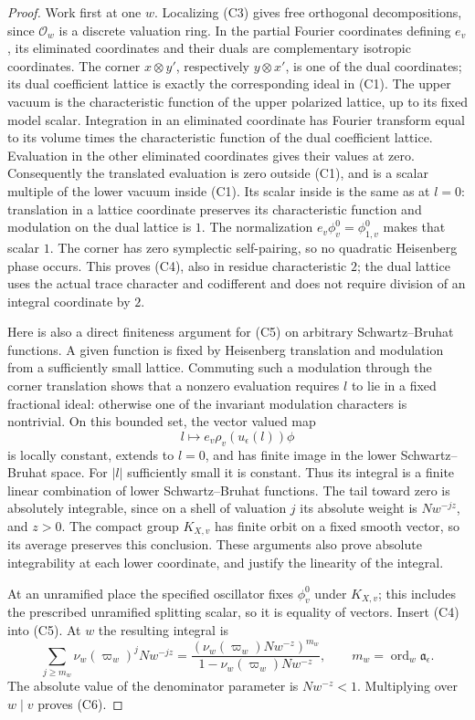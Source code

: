 \begin{proof}
Work first at one \(w\). Localizing (C3) gives free orthogonal
decompositions, since \(\mathcal O_w\) is a discrete valuation ring.
In the partial Fourier coordinates defining \(e_v\), its eliminated
coordinates and their duals are complementary isotropic coordinates.
The corner \(x\otimes y'\), respectively \(y\otimes x'\), is one
of the dual coordinates; its dual coefficient lattice is exactly the
corresponding ideal in (C1). The upper vacuum is the characteristic
function of the upper polarized lattice, up to its fixed model scalar.
Integration in an eliminated coordinate has Fourier transform equal to
its volume times the characteristic function of the dual coefficient
lattice. Evaluation in the other eliminated coordinates gives their
values at zero. Consequently the translated evaluation is zero outside
(C1), and is a scalar multiple of the lower vacuum inside (C1).
Its scalar inside is the same as at \(l=0\): translation in a lattice
coordinate preserves its characteristic function and modulation on the
dual lattice is \(1\). The normalization
\(e_v\phi_v^0=\phi_{1,v}^0\) makes that scalar \(1\).
The corner has zero symplectic self-pairing, so no quadratic Heisenberg
phase occurs. This proves (C4), also in residue characteristic \(2\);
the dual lattice uses the actual trace character and codifferent and
does not require division of an integral coordinate by \(2\).

Here is also a direct finiteness argument for (C5) on arbitrary
Schwartz--Bruhat functions. A given function is fixed by Heisenberg
translation and modulation from a sufficiently small lattice.
Commuting such a modulation through the corner translation shows that
a nonzero evaluation requires \(l\) to lie in a fixed fractional ideal:
otherwise one of the invariant modulation characters is nontrivial.
On this bounded set, the vector valued map
\[
 l\longmapsto e_v\rho_v(u_\epsilon(l))\phi
\]
is locally constant, extends to \(l=0\), and has finite image in the
lower Schwartz--Bruhat space. For \(|l|\) sufficiently small it is
constant. Thus its integral is a finite linear combination of lower
Schwartz--Bruhat functions. The tail toward zero is absolutely
integrable, since on a shell of valuation \(j\) its absolute weight is
\(Nw^{-jz}\), and \(z>0\). The compact group \(K_{X,v}\) has finite orbit
on a fixed smooth vector, so its average preserves this conclusion.
These arguments also prove absolute integrability at each lower
coordinate, and justify the linearity of the integral.

At an unramified place the specified oscillator fixes \(\phi_v^0\)
under \(K_{X,v}\); this includes the prescribed unramified splitting
scalar, so it is equality of vectors. Insert (C4) into (C5). At \(w\)
the resulting integral is
\[
 \sum_{j\ge m_w}\nu_w(\varpi_w)^jNw^{-jz}
    =\frac{(\nu_w(\varpi_w)Nw^{-z})^{m_w}}
                  {1-\nu_w(\varpi_w)Nw^{-z}},\qquad
       m_w=\operatorname{ord}_w\mathfrak a_\epsilon.
\]
The absolute value of the denominator parameter is \(Nw^{-z}<1\).
Multiplying over \(w\mid v\) proves (C6).
\end{proof}

